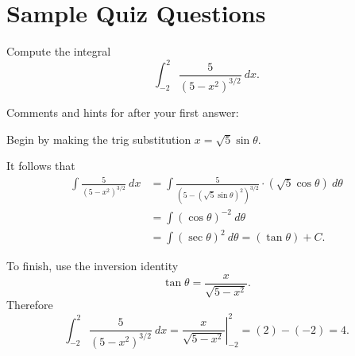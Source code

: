 \documentclass{ximera}
\begin{document}
\section*{Sample Quiz Questions}
\begin{question}%

Compute the integral 
\[\int_{-2}^{2}\frac{5}{(5-x^2)^{3/2}}~dx.\]
\begin{multiplechoice}
\end{multiplechoice}
Comments and hints for after your first answer:
\begin{feedback}
Begin by making the trig substitution \(x=\sqrt{5}\sin \theta\). \begin{hint} It follows that 
\[ \begin{aligned} \int\frac{5}{(5-x^2)^{3/2}}~dx & = \int \frac{5}{(5-(\sqrt{5}\sin \theta)^2)^{3/2}} \cdot (\sqrt{5}\cos \theta)~d \theta \\
 & = \int (\cos \theta)^{-2}~d \theta \\ & = \int (\sec \theta)^{2} ~ d \theta = (\tan \theta) + C. \end{aligned} \] \begin{hint}
To finish, use the inversion identity \[\tan \theta = \frac{x}{\sqrt{5-x^2}}.\]
Therefore \[\int_{-2}^{2}\frac{5}{(5-x^2)^{3/2}}~dx = \left.\frac{x}{\sqrt{5-x^2}}\right|_{-2}^{2} = \left(2\right) - \left(-2\right) = 4.\] \end{hint} \end{hint}
\end{feedback}

\end{question}
\end{document}

